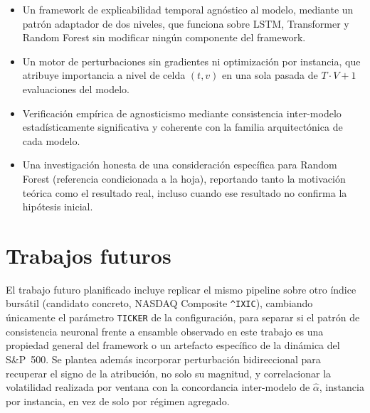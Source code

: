 \begin{itemize}
    \item Un framework de explicabilidad temporal agnóstico al modelo, mediante un patrón adaptador de dos niveles, que funciona sobre LSTM, Transformer y Random Forest sin modificar ningún componente del framework.
    \item Un motor de perturbaciones sin gradientes ni optimización por instancia, que atribuye importancia a nivel de celda $(t,v)$ en una sola pasada de $T{\cdot}V{+}1$ evaluaciones del modelo.
    \item Verificación empírica de agnosticismo mediante consistencia inter-modelo estadísticamente significativa y coherente con la familia arquitectónica de cada modelo.
    \item Una investigación honesta de una consideración específica para Random Forest (referencia condicionada a la hoja), reportando tanto la motivación teórica como el resultado real, incluso cuando ese resultado no confirma la hipótesis inicial.
\end{itemize}

\section{Trabajos futuros}

El trabajo futuro planificado incluye replicar el mismo pipeline sobre otro índice bursátil (candidato concreto, NASDAQ Composite \texttt{\^{}IXIC}), cambiando únicamente el parámetro \texttt{TICKER} de la configuración, para separar si el patrón de consistencia neuronal frente a ensamble observado en este trabajo es una propiedad general del framework o un artefacto específico de la dinámica del S\&P~500. Se plantea además incorporar perturbación bidireccional para recuperar el signo de la atribución, no solo su magnitud, y correlacionar la volatilidad realizada por ventana con la concordancia inter-modelo de $\hat{\alpha}$, instancia por instancia, en vez de solo por régimen agregado.
